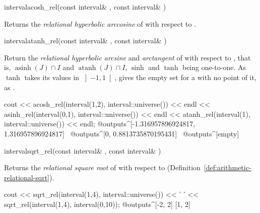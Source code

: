 \begin{deffun}{interval}{acosh\_rel}{(const interval\& , const interval\& )}
  \begin{operation}
  \end{operation}
  Returns the \emph{relational hyperbolic arccosine} of  with respect
  to .
\end{deffun}

\begin{deffun}{interval}{atanh\_rel}{(const interval\& , const interval\& )}
  \begin{operation}
  \end{operation}
  Return the \emph{relational hyperbolic arcsine} and \emph{arctangent} of
   with respect to , that is, $\operatorname{asinh}(J)\cap I$
  and $\operatorname{atanh}(J)\cap I$, $\sinh$ and $\tanh$ being one-to-one.
  As $\tanh$ takes its values in $\left]-1,1\right[$, 
  gives the empty set for a  with no point of it, as .
\begin{example}
cout << acosh_rel(interval(1,2), interval::universe()) << endl
     << asinh_rel(interval(0,1), interval::universe()) << endl
     << atanh_rel(interval(1), interval::universe()) << endl;
@outputs^[-1.316957896924817, 1.316957896924817]~
@outputs^[0, 0.8813735870195431]~
@outputs^[empty]~
\end{example}
\end{deffun}

\begin{deffun}{interval}{sqrt\_rel}{(const interval\& , const interval\& )}
  \begin{operation}
  \end{operation}
  Returns the \emph{relational square root} of  with respect to
   (Definition~\ref{def:arithmetic-relational-sqrt}).
\begin{example}
cout << sqrt_rel(interval(1,4), interval::universe()) << ' '
     << sqrt_rel(interval(1,4), interval(0,10));
@outputs^[-2, 2] [1, 2]~
\end{example}
\end{deffun}

